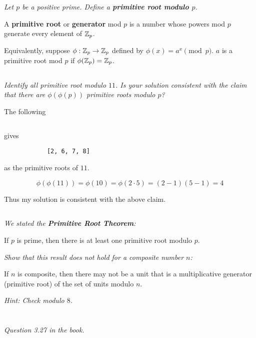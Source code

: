\documentclass[12pt]{article}
\begin{document}
\section{}
    \subsection{} \textit{Let $p$ be a positive prime. Define a \textbf{primitive root modulo $p$}.}

        \begin{defn}
            A \textbf{primitive root} or \textbf{generator} mod $p$ is a number whose powers mod $p$ generate every element of $\mathbb{Z}_p$.

            Equivalently, suppose $\phi : \mathbb{Z}_p \to \mathbb{Z}_p$ defined by $\phi(x) = a^x \pmod{p}$. $a$ is a primitive root mod $p$ if $\phi(\mathbb{Z}_p) = \mathbb{Z}_p$.
        \end{defn}

    \subsection{} \textit{Identify all primitive root modulo $11$. Is your solution consistent with the claim that there are $\phi(\phi(p))$ primitive roots modulo $p$?}

        The following
        \inputminted{python}{hw2_6.py}
        gives
        \begin{verbatim}
            [2, 6, 7, 8]
        \end{verbatim}
        as the primitive roots of $11$.

        $$\phi(\phi(11)) = \phi(10) = \phi(2 \cdot 5) = (2 - 1)(5 - 1) = 4$$

        Thus my solution is consistent with the above claim.

    \subsection{} \textit{We stated the \textbf{Primitive Root Theorem}:}

        \begin{thm}
            If $p$ is prime, then there is at least one primitive root modulo $p$.
        \end{thm}

        \textit{Show that this result does not hold for a composite number $n$:}

        \begin{thm}
            If $n$ is composite, then there may not be a unit that is a multiplicative generator (primitive root) of the set of units modulo $n$.
        \end{thm}

        \textit{Hint: Check modulo $8$.}

\section{} \textit{Question 3.27 in the book.}
\end{document}
